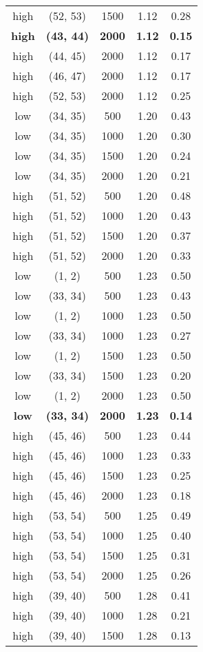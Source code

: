 \begin{tabular}{c c c c c}
high & (52, 53) &  1500 & 1.12 & 0.28 \\
\textbf{high} & \textbf{(43, 44)} & \textbf{ 2000} & \textbf{1.12} & \textbf{0.15} \\
high & (44, 45) &  2000 & 1.12 & 0.17 \\
high & (46, 47) &  2000 & 1.12 & 0.17 \\
high & (52, 53) &  2000 & 1.12 & 0.25 \\
low & (34, 35) &  500 & 1.20 & 0.43 \\
low & (34, 35) &  1000 & 1.20 & 0.30 \\
low & (34, 35) &  1500 & 1.20 & 0.24 \\
low & (34, 35) &  2000 & 1.20 & 0.21 \\
high & (51, 52) &  500 & 1.20 & 0.48 \\
high & (51, 52) &  1000 & 1.20 & 0.43 \\
high & (51, 52) &  1500 & 1.20 & 0.37 \\
high & (51, 52) &  2000 & 1.20 & 0.33 \\
low & (1, 2) &  500 & 1.23 & 0.50 \\
low & (33, 34) &  500 & 1.23 & 0.43 \\
low & (1, 2) &  1000 & 1.23 & 0.50 \\
low & (33, 34) &  1000 & 1.23 & 0.27 \\
low & (1, 2) &  1500 & 1.23 & 0.50 \\
low & (33, 34) &  1500 & 1.23 & 0.20 \\
low & (1, 2) &  2000 & 1.23 & 0.50 \\
\textbf{low} & \textbf{(33, 34)} & \textbf{ 2000} & \textbf{1.23} & \textbf{0.14} \\
high & (45, 46) &  500 & 1.23 & 0.44 \\
high & (45, 46) &  1000 & 1.23 & 0.33 \\
high & (45, 46) &  1500 & 1.23 & 0.25 \\
high & (45, 46) &  2000 & 1.23 & 0.18 \\
high & (53, 54) &  500 & 1.25 & 0.49 \\
high & (53, 54) &  1000 & 1.25 & 0.40 \\
high & (53, 54) &  1500 & 1.25 & 0.31 \\
high & (53, 54) &  2000 & 1.25 & 0.26 \\
high & (39, 40) &  500 & 1.28 & 0.41 \\
high & (39, 40) &  1000 & 1.28 & 0.21 \\
high & (39, 40) &  1500 & 1.28 & 0.13 \\

\end{tabular}
